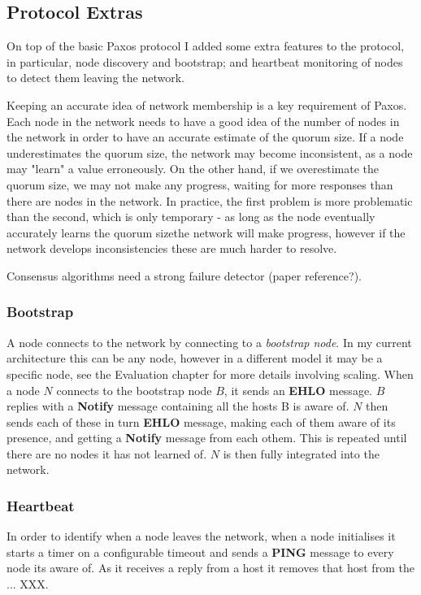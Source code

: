 \documentclass[12pt,twoside,notitlepage]{report}
\newcommand{\msg}[1] {{\bf #1}}
\begin{document}
\subsection{Protocol Extras}

On top of the basic Paxos protocol I added some extra features to the protocol, in particular,
node discovery and bootstrap; and heartbeat monitoring of nodes to detect them leaving the
network.

Keeping an accurate idea of network membership is a key requirement of Paxos. Each node in the
network needs to have a good idea of the number of nodes in the network in order to have an
accurate estimate of the quorum size. If a node underestimates the quorum size, the network may
become inconsistent, as a node may "learn" a value erroneously. On the other hand, if we
overestimate the quorum size, we may not make any progress, waiting for more responses than there
are nodes in the network. In practice, the first problem is more problematic than the second,
which is only temporary - as long as the node eventually accurately learns the quorum sizethe
network will make progress, however if the network develops inconsistencies these are much harder
to resolve.

Consensus algorithms need a strong failure detector (paper reference?).

\subsubsection{Bootstrap}

A node connects to the network by connecting to a \emph{bootstrap node}. In my current
architecture this can be any node, however in a different model it may be a specific node, see the
Evaluation chapter for more details involving scaling. When a node $N$ connects to the bootstrap
node $B$, it sends an \msg{EHLO} message. $B$ replies with a \msg{Notify} message containing all the
hosts B is aware of. $N$ then sends each of these in turn \msg{EHLO} message, making each of them
aware of its presence, and getting a \msg{Notify} message from each othem. This is repeated until
there are no nodes it has not learned of. $N$ is then fully integrated into the network.

\subsubsection{Heartbeat}

In order to identify when a node leaves the network, when a node initialises it starts a timer on
a configurable timeout and sends a \msg{PING} message to every node its aware of. As it receives a
reply from a host it removes that host from the ... XXX.
\end{document}
